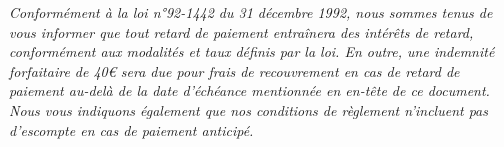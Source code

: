 \documentclass[11pt,a4paper]{article}
\begin{document}
\vspace{0.5cm}
\textit{\footnotesize Conformément à la loi n°92-1442 du 31 décembre 1992, nous sommes tenus de vous informer que tout retard de paiement entraînera des intérêts de retard, conformément aux modalités et taux définis par la loi. En outre, une indemnité forfaitaire de 40€ sera due pour frais de recouvrement en cas de retard de paiement au-delà de la date d'échéance mentionnée en en-tête de ce document. Nous vous indiquons également que nos conditions de règlement n'incluent pas d'escompte en cas de paiement anticipé.}
\end{document}
